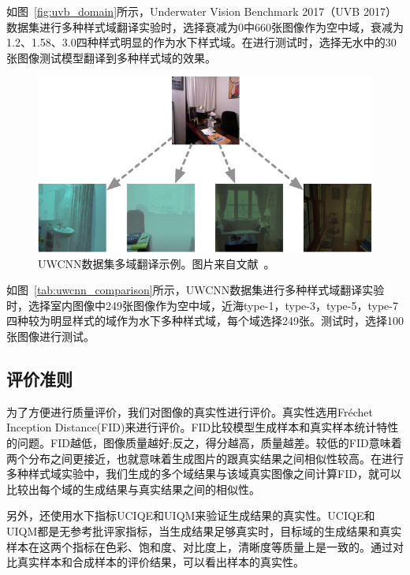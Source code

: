 如图~\ref{fig:uvb_domain}所示，Underwater Vision Benchmark 2017（UVB 2017）数据集进行多种样式域翻译实验时，选择衰减为0中660张图像作为空中域，衰减为1.2、1.58、3.0四种样式明显的作为水下样式域。在进行测试时，选择无水中的30张图像测试模型翻译到多种样式域的效果。

\begin{figure}[ht]
    \centering
  \includegraphics[width=\textwidth]{figures/UWCNN_dataset_domain.pdf}
  \caption{UWCNN数据集多域翻译示例。图片来自文献~\cite{li2020underwater}。}
  \label{fig:uwcnn_domain}
\end{figure}

如图~\ref{tab:uwcnn_comparison}所示，UWCNN数据集进行多种样式域翻译实验时，选择室内图像中249张图像作为空中域，近海type-1，type-3，type-5，type-7四种较为明显样式的域作为水下多种样式域，每个域选择249张。测试时，选择100张图像进行测试。

\subsection{评价准则}
为了方便进行质量评价，我们对图像的真实性进行评价。真实性选用Fréchet Inception Distance(FID)来进行评价。FID比较模型生成样本和真实样本统计特性的问题。FID越低，图像质量越好;反之，得分越高，质量越差。较低的FID意味着两个分布之间更接近，也就意味着生成图片的跟真实结果之间相似性较高。在进行多种样式域实验中，我们生成的多个域结果与该域真实图像之间计算FID，就可以比较出每个域的生成结果与真实结果之间的相似性。

另外，还使用水下指标UCIQE和UIQM来验证生成结果的真实性。UCIQE和UIQM都是无参考批评家指标，当生成结果足够真实时，目标域的生成结果和真实样本在这两个指标在色彩、饱和度、对比度上，清晰度等质量上是一致的。通过对比真实样本和合成样本的评价结果，可以看出样本的真实性。


